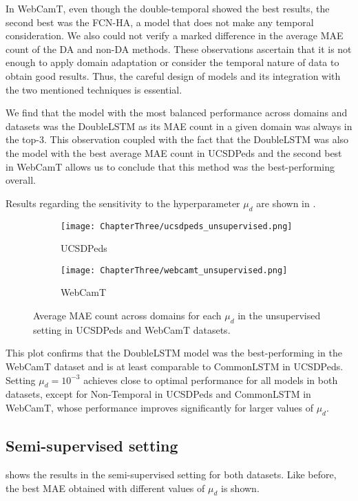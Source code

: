In WebCamT, even though the double-temporal showed the best results, the second best was the FCN-HA, a model that does not make any temporal consideration. We also could not verify a marked difference in the average MAE count of the DA and non-DA methods. These observations ascertain that it is not enough to apply domain adaptation or consider the temporal nature of data to obtain good results. Thus, the careful design of models and its integration with the two mentioned techniques is essential. 

We find that the model with the most balanced performance across domains and datasets was the DoubleLSTM as its MAE count in a given domain was always in the top-3. This observation coupled with the fact that the DoubleLSTM was also the model with the best average MAE count in UCSDPeds and the second best in WebCamT allows us to conclude that this method was the best-performing overall.

Results regarding the sensitivity to the hyperparameter $\mu_d$ are shown in .

\begin{figure}[!ht]
	\begin{subfigure}{.5\textwidth}
		\centering
		\texttt{[image: ChapterThree/ucsdpeds\_unsupervised.png]}
		\caption{UCSDPeds}
	\end{subfigure}
	\begin{subfigure}{.5\textwidth}
		\centering
		\texttt{[image: ChapterThree/webcamt\_unsupervised.png]}
		\caption{WebCamT}
	\end{subfigure}
	\caption{Average MAE count across domains for each $\mu_d$ in the unsupervised setting in UCSDPeds and WebCamT datasets.}
	\label{fig:lambda_d_unsup}
\end{figure}

This plot confirms that the DoubleLSTM model was the best-performing in the WebCamT dataset and is at least comparable to CommonLSTM in UCSDPeds. Setting $\mu_d = 10^{-3}$ achieves close to optimal performance for all models in both datasets, except for Non-Temporal in UCSDPeds and CommonLSTM in WebCamT, whose performance improves significantly for larger values of $\mu_d$.

\subsection{Semi-supervised setting}

 shows the results in the semi-supervised setting for both datasets. Like before, the best MAE obtained with different values of $\mu_d$ is shown.

